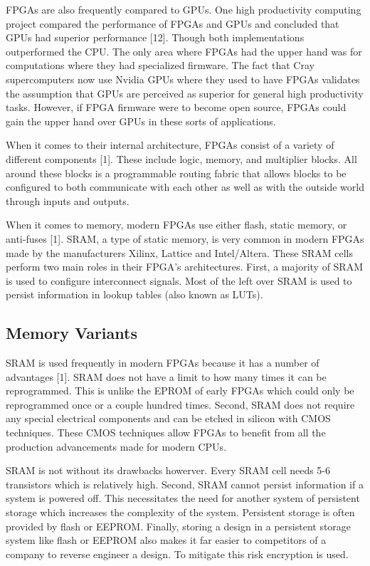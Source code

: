 \documentclass{article}
\begin{document}
    FPGAs are also frequently compared to GPUs. One high productivity computing project
    compared the performance of FPGAs and GPUs and concluded that GPUs had superior performance [12].
    Though both implementations outperformed the CPU.
    The only area where FPGAs had the upper hand was for computations where they had
    specialized firmware.
    The fact that Cray supercomputers now use Nvidia GPUs where they used to have FPGAs
    validates the assumption that GPUs are perceived as superior for general high productivity tasks.
    However, if FPGA firmware were to become open source, FPGAs could gain the upper
    hand over GPUs in these sorts of applications.

    When it comes to their internal architecture, FPGAs consist of a variety of different
    components [1]. These include logic, memory, and multiplier blocks. All around these
    blocks is a programmable routing fabric that allows blocks to be configured to both
    communicate with each other as well as with the outside world through inputs and outputs.

    When it comes to memory, modern FPGAs use either flash, static memory, or anti-fuses [1].
    SRAM, a type of static memory, is very common in modern FPGAs made by the manufacturers
    Xilinx, Lattice and Intel/Altera. These SRAM cells perform two main roles in their FPGA's
    architectures. First, a majority of SRAM is used to configure interconnect signals.
    Most of the left over SRAM is used to persist information in lookup tables (also known as
    LUTs).

    \subsection{Memory Variants}

    SRAM is used frequently in modern FPGAs because it has a number of advantages [1]. SRAM
    does not have a limit to how many times it can be reprogrammed. This is unlike the
    EPROM of early FPGAs which could only be reprogrammed once or a couple hundred times.
    Second, SRAM does not require any special electrical components and can be etched
    in silicon with CMOS techniques. These CMOS techniques allow FPGAs to benefit from
    all the production advancements made for modern CPUs.

    SRAM is not without its drawbacks howerver. Every SRAM cell needs 5-6 transistors
    which is relatively high. Second, SRAM cannot persist information if a system is powered
    off. This necessitates the need for another system of persistent storage which increases
    the complexity of the system. Persistent storage is often provided by flash or EEPROM.
    Finally, storing a design in a persistent storage system like flash or EEPROM also
    makes it far easier to competitors of a company to reverse engineer a design.
    To mitigate this risk encryption is used.
\end{document}
